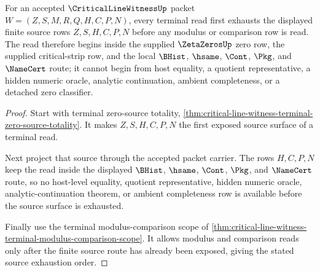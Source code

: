 \begin{theorem}
\label{thm:critical-line-witness-terminal-source-exhaustion}
For an accepted $\CriticalLineWitnessUp$ packet $W=(Z,S,M,R,Q,H,C,P,N)$, every terminal read first exhausts the displayed finite source rows $Z,S,H,C,P,N$ before any modulus or comparison row is read. The read therefore begins inside the supplied $\ZetaZerosUp$ zero row, the supplied critical-strip row, and the local $\BHist$, $\hsame$, $\Cont$, $\Pkg$, and $\NameCert$ route; it cannot begin from host equality, a quotient representative, a hidden numeric oracle, analytic continuation, ambient completeness, or a detached zero classifier.
\end{theorem}
\begin{proof}
Start with terminal zero-source totality, \autoref{thm:critical-line-witness-terminal-zero-source-totality}. It makes $Z,S,H,C,P,N$ the first exposed source surface of a terminal read.

Next project that source through the accepted packet carrier. The rows $H,C,P,N$ keep the read inside the displayed $\BHist$, $\hsame$, $\Cont$, $\Pkg$, and $\NameCert$ route, so no host-level equality, quotient representative, hidden numeric oracle, analytic-continuation theorem, or ambient completeness row is available before the source surface is exhausted.

Finally use the terminal modulus-comparison scope of \autoref{thm:critical-line-witness-terminal-modulus-comparison-scope}. It allows modulus and comparison reads only after the finite source route has already been exposed, giving the stated source exhaustion order.
\end{proof}

